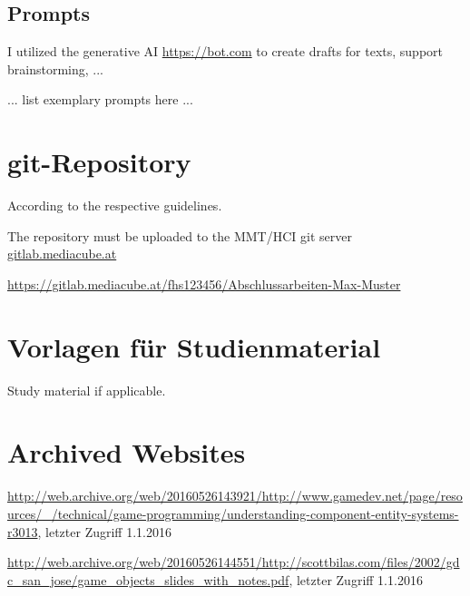 \begin{appendices}
\subsection{Prompts}
I utilized the generative AI \url{https://bot.com} to create drafts for texts, support brainstorming, ...

... list exemplary prompts here ...

\section{git-Repository}

According to the respective guidelines.

The repository must be uploaded to the MMT/HCI git server {\url{gitlab.mediacube.at}}

{\color{red}\url{https://gitlab.mediacube.at/fhs123456/Abschlussarbeiten-Max-Muster}}
	
\section{Vorlagen für Studienmaterial}

Study material if applicable. 

\section{Archived Websites}
\sloppy
\url{http://web.archive.org/web/20160526143921/http://www.gamedev.net/page/resources/_/technical/game-programming/understanding-component-entity-systems-r3013}, letzter Zugriff 1.1.2016

\url{http://web.archive.org/web/20160526144551/http://scottbilas.com/files/2002/gdc_san_jose/game_objects_slides_with_notes.pdf}, letzter Zugriff 1.1.2016

\end{appendices}
